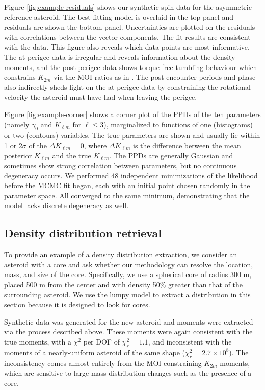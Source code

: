\documentclass[fleqn,usenatbib]{mnras}
\begin{document}
Figure \ref{fig:example-residuals} shows our synthetic spin data for the asymmetric reference asteroid. The best-fitting model is overlaid in the top panel and residuals are shown the bottom panel. Uncertainties are plotted on the residuals with correlations between the vector components. The fit results are consistent with the data. This figure also reveals which data points are most informative. The at-perigee data is irregular and reveals information about the density moments, and the post-perigee data shows torque-free tumbling behaviour which constrains $K_{2m}$ via the MOI ratios as in \cite{MOSKOVITZ2020113519}. The post-encounter periods and phase also indirectly sheds light on the at-perigee data by constraining the rotational velocity the asteroid must have had when leaving the perigee.

Figure \ref{fig:example-corner} shows a corner plot of the PPDs of the ten parameters (namely $\gamma_0$ and $K_{\ell m}$ for $\ell \leq 3$), marginalized to functions of one (histograms) or two (contours) variables. The true parameters are shown and usually lie within 1 or 2$\sigma$ of the $\Delta K_{\ell m} = 0$, where $\Delta K_{\ell m}$ is the difference between the mean posterior $K_{\ell m}$ and the true $K_{\ell m}$. The PPDs are generally Gaussian and sometimes show strong correlation between parameters, but no continuous degeneracy occurs. We performed 48 independent minimizations of the likelihood before the MCMC fit began, each with an initial point chosen randomly in the parameter space. All converged to the same minimum, demonstrating that the model lacks discrete degeneracy as well.



\subsection{Density distribution retrieval}
\label{sec:results-distro}

To provide an example of a density distribution extraction, we consider an asteroid with a core and ask whether our methodology can resolve the location, mass, and size of the core. Specifically, we use a spherical core of radius 300 m, placed 500 m from the center and with density 50\% greater than that of the surrounding asteroid. We use the lumpy model to extract a distribution in this section because it is designed to look for cores.

Synthetic data was generated for the new asteroid and moments were extracted via the process described above. These moments were again consistent with the true moments, with a $\chi^2$ per DOF of $\chi^2_r = 1.1$, and inconsistent with the moments of a nearly-uniform asteroid of the same shape ($\chi^2_r = 2.7 \times 10^8$). The inconsistency comes almost entirely from the MOI-constraining $K_{2m}$ moments, which are sensitive to large mass distribution changes such as the presence of a core.
\end{document}
